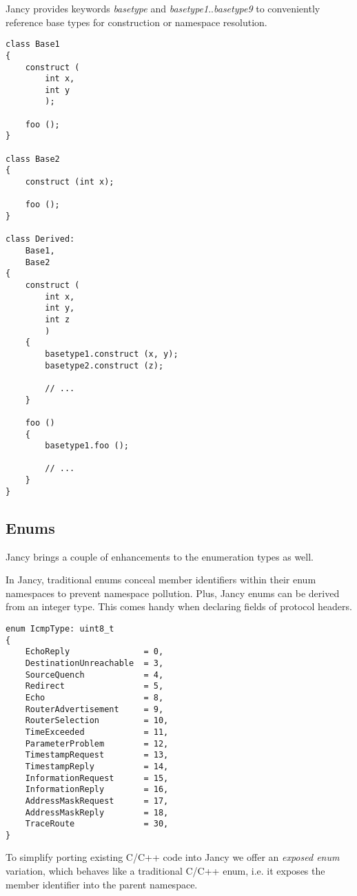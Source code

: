 \documentclass[oneside]{book}
\begin{document}
Jancy provides keywords \emph{basetype} and \emph{basetype1}..\emph{basetype9} to conveniently reference base types for construction or namespace resolution.

\begin{lstlisting}
class Base1
{
    construct (
        int x,
        int y
        );

    foo ();
}

class Base2
{
    construct (int x);

    foo ();
}

class Derived: 
    Base1, 
    Base2
{
    construct (
        int x,
        int y,
        int z
        )
    {
        basetype1.construct (x, y);
        basetype2.construct (z);
    
        // ...
    }

    foo ()
    {
        basetype1.foo ();

        // ...
    }
}
\end{lstlisting}

\subsection{Enums}

Jancy brings a couple of enhancements to the enumeration types as well.

In Jancy, traditional enums conceal member identifiers within their enum namespaces to prevent namespace pollution. Plus, Jancy enums can be derived from an integer type. This comes handy when declaring fields of protocol headers.

\begin{lstlisting}
enum IcmpType: uint8_t
{
    EchoReply               = 0,
    DestinationUnreachable  = 3,
    SourceQuench            = 4,
    Redirect                = 5,
    Echo                    = 8,
    RouterAdvertisement     = 9,
    RouterSelection         = 10,
    TimeExceeded            = 11,
    ParameterProblem        = 12,
    TimestampRequest        = 13,
    TimestampReply          = 14,
    InformationRequest      = 15,
    InformationReply        = 16,
    AddressMaskRequest      = 17,
    AddressMaskReply        = 18,
    TraceRoute              = 30,
}
\end{lstlisting}

To simplify porting existing C/C++ code into Jancy we offer an \emph{exposed enum} variation, which behaves like a traditional C/C++ enum, i.e. it exposes the member identifier into the parent namespace.
\end{document}
